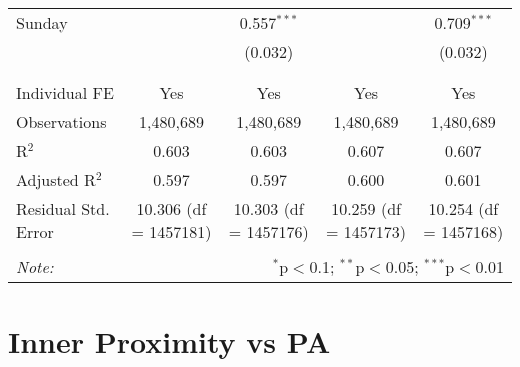 \documentclass[
]{article}
\begin{document}
\begin{table}[!htbp]
{\begin{tabular}{@{\extracolsep{5pt}}lcccc}
 Sunday &  & 0.557$^{***}$ &  & 0.709$^{***}$ \\ 
  &  & (0.032) &  & (0.032) \\ 
  & & & & \\ 
\hline \\[-1.8ex] 
Individual FE & Yes & Yes & Yes & Yes \\ 
Observations & 1,480,689 & 1,480,689 & 1,480,689 & 1,480,689 \\ 
R$^{2}$ & 0.603 & 0.603 & 0.607 & 0.607 \\ 
Adjusted R$^{2}$ & 0.597 & 0.597 & 0.600 & 0.601 \\ 
Residual Std. Error & 10.306 (df = 1457181) & 10.303 (df = 1457176) & 10.259 (df = 1457173) & 10.254 (df = 1457168) \\ 
\hline 
\hline \\[-1.8ex] 
\textit{Note:}  & \multicolumn{4}{r}{$^{*}$p$<$0.1; $^{**}$p$<$0.05; $^{***}$p$<$0.01} \\ 
\end{tabular}
} 
\end{table} 
\newpage
\section{Inner Proximity vs PA}
\end{document}

